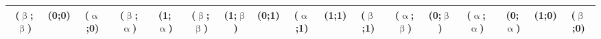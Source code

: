 {\begin{minipage}[c]{0.9\textheight}
\begin{center}
\begin{tabularx}{1.06\linewidth}{c|cccccccccccccccc}
 ($\upbeta$;$\upbeta$) & (0;0) & ($\upalpha$;0) & ($\upbeta$;$\upalpha$) & (1;$\upalpha$) & ($\upbeta$;$\upbeta$) & (1;$\upbeta$) & (0;1) & ($\upalpha$;1) & (1;1) & ($\upbeta$;1) & ($\upalpha$;$\upbeta$) & (0;$\upbeta$) & ($\upalpha$;$\upalpha$) & (0;$\upalpha$) & (1;0) & ($\upbeta$;0)\\
 \bottomrule
 \end{tabularx}
\end{center}
\end{minipage}
}
